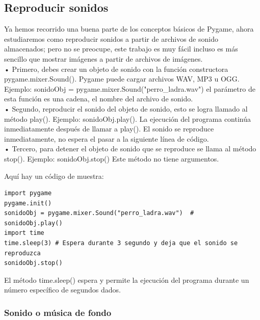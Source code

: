 \subsection{Reproducir sonidos}

Ya hemos recorrido una buena parte de los conceptos básicos de Pygame, ahora estudiaremos como reproducir sonidos
a partir de archivos de sonido almacenados; pero no se preocupe, este trabajo es muy fácil incluso es más sencillo 
que mostrar imágenes a partir de archivos de imágenes.\\

• Primero, debes crear un objeto de sonido con la función constructora  {\ttfamily pygame.mixer.Sound()}.
Pygame puede cargar archivos WAV, MP3 u OGG.  Ejemplo: {\ttfamily sonidoObj = pygame.mixer.Sound("perro\_ladra.wav")} 
el  parámetro de esta función es una cadena,  el nombre del archivo de sonido. \\

• Segundo, reproducir el sonido del objeto de sonido, esto se logra  llamado al método {\ttfamily  play()}. Ejemplo: {\ttfamily sonidoObj.play()}.
La ejecución del programa continúa inmediatamente después de llamar a play(). El sonido se reproduce inmediatamente,  no espera el
pasar a la siguiente línea de código.\\

• Tercero, para detener el objeto de sonido que se reproduce se llama al método  {\ttfamily stop()}. Ejemplo: {\ttfamily sonidoObj.stop()}
Este método  no tiene argumentos.

Aquí hay un código de muestra:

\hspace{-2.2cm}{\ttfamily \scriptsize sonido.py} \vspace{-0.7cm}
\begin{lstlisting}		
import pygame
pygame.init()
sonidoObj = pygame.mixer.Sound("perro_ladra.wav")  #  
sonidoObj.play()
import time
time.sleep(3) # Espera durante 3 segundo y deja que el sonido se reproduzca 
sonidoObj.stop()
\end{lstlisting}
El método {\ttfamily time.sleep()} espera y permite la ejecución del programa durante un número específico de segundos dados.

\subsubsection{Sonido o música de fondo}

